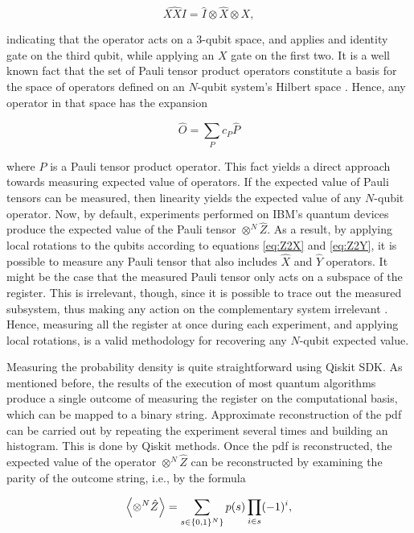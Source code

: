     \begin{equation}
      \hat{XXI} = \hat{I} \otimes \hat{X} \otimes{X},
    \end{equation}

    \noindent indicating that the operator acts on a 3-qubit space, and applies and identity gate on the third qubit, while applying an $X$ gate on the first two. It is a well known fact that the set of Pauli tensor product operators constitute a basis for the space of operators defined on an $N$-qubit system's Hilbert space \cite{Nielsen, Strini}. Hence, any operator in that space has the expansion
    
    \begin{equation}
      \hat{O} = \sum_{P} c_P \hat{P}
    \end{equation}

    \noindent where $P$ is a Pauli tensor product operator. This fact yields a direct approach towards measuring expected value of operators. If the expected value of Pauli tensors can be measured, then linearity yields the expected value of any $N$-qubit operator. Now, by default, experiments performed on IBM's quantum devices produce the expected value of the Pauli tensor $\otimes^{N} \hat{Z}$. As a result, by applying local rotations to the qubits according to equations \ref{eq:Z2X} and \ref{eq:Z2Y}, it is possible to measure any Pauli tensor that also includes $\hat{X}$ and $\hat{Y}$ operators. It might be the case that the measured Pauli tensor only acts on a subspace of the register. This is irrelevant, though, since it is possible to trace out the measured subsystem, thus making any action on the complementary system irrelevant \cite{Nielsen}. Hence, measuring all the register at once during each experiment, and applying local rotations, is a valid methodology for recovering any $N$-qubit expected value.

    Measuring the probability density is quite straightforward using Qiskit SDK. As mentioned before, the results of the execution of most quantum algorithms produce a single outcome of measuring the register on the computational basis, which can be mapped to a binary string. Approximate reconstruction of the pdf can be carried out by repeating the experiment several times and building an histogram. This is done by Qiskit methods. Once the pdf is reconstructed, the expected value of the operator $\otimes^{N} \hat{Z}$ can be reconstructed by examining the parity of the outcome string, i.e., by the formula
    
    \begin{equation}
      \expval{\otimes^{N} \hat{Z}} = \sum_{s \in \{0,1\}^{N}\}} p(s) \prod_{i \in s} (-1)^{i},
      \label{eq:expValPauliZ}
    \end{equation}


